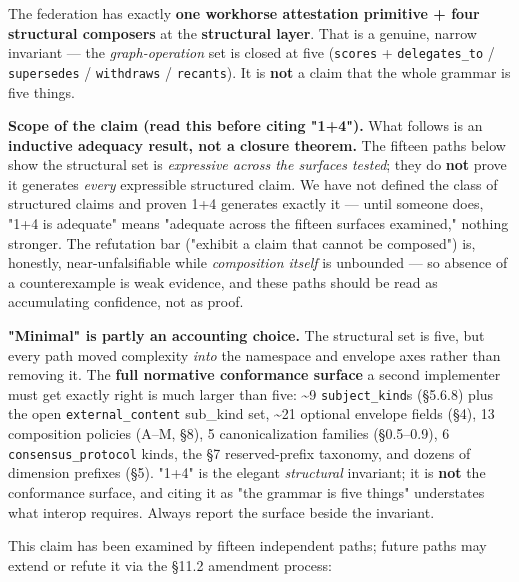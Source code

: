 \documentclass[10pt]{article}
\begin{document}
The federation has exactly \textbf{one workhorse attestation primitive + four structural composers} at the \textbf{structural layer}. That is a genuine, narrow invariant — the \textit{graph-operation} set is closed at five (\texttt{scores} + \texttt{delegates\_to} / \texttt{supersedes} / \texttt{withdraws} / \texttt{recants}). It is \textbf{not} a claim that the whole grammar is five things.


\textbf{Scope of the claim (read this before citing "1+4").} What follows is an \textbf{inductive adequacy result, not a closure theorem.} The fifteen paths below show the structural set is \textit{expressive across the surfaces tested}; they do \textbf{not} prove it generates \textit{every} expressible structured claim. We have not defined the class of structured claims and proven 1+4 generates exactly it — until someone does, "1+4 is adequate" means "adequate across the fifteen surfaces examined," nothing stronger. The refutation bar ("exhibit a claim that cannot be composed") is, honestly, near-unfalsifiable while \textit{composition itself} is unbounded — so absence of a counterexample is weak evidence, and these paths should be read as accumulating confidence, not as proof.


\textbf{"Minimal" is partly an accounting choice.} The structural set is five, but every path moved complexity \textit{into} the namespace and envelope axes rather than removing it. The \textbf{full normative conformance surface} a second implementer must get exactly right is much larger than five: \textasciitilde{}9 \texttt{subject\_kind}s (§5.6.8) plus the open \texttt{external\_content} sub\_kind set, \textasciitilde{}21 optional envelope fields (§4), 13 composition policies (A–M, §8), 5 canonicalization families (§0.5–0.9), 6 \texttt{consensus\_protocol} kinds, the §7 reserved-prefix taxonomy, and dozens of dimension prefixes (§5). "1+4" is the elegant \textit{structural} invariant; it is \textbf{not} the conformance surface, and citing it as "the grammar is five things" understates what interop requires. Always report the surface beside the invariant.


This claim has been examined by fifteen independent paths; future paths may extend or refute it via the §11.2 amendment process:
\end{document}

